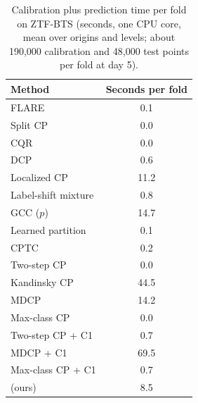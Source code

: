 \begin{table}[!htbp]
\centering
\caption{Calibration plus prediction time per fold on ZTF-BTS (seconds, one CPU core, mean over origins and levels; about 190,000 calibration and 48,000 test points per fold at day 5).}
\label{tab:runtime}
\scriptsize
\begin{tabular}{lc}
\toprule
Method & Seconds per fold \\
\midrule
FLARE & 0.1 \\
Split CP & 0.0 \\
CQR & 0.0 \\
DCP & 0.6 \\
Localized CP & 11.2 \\
Label-shift mixture & 0.8 \\
GCC ($p$) & 14.7 \\
Learned partition & 0.1 \\
CPTC & 0.2 \\
Two-step CP & 0.0 \\
Kandinsky CP & 44.5 \\
MDCP & 14.2 \\
Max-class CP & 0.0 \\
Two-step CP + C1 & 0.7 \\
MDCP + C1 & 69.5 \\
Max-class CP + C1 & 0.7 \\
\gamut{} (ours) & 8.5 \\
\bottomrule
\end{tabular}
\end{table}
